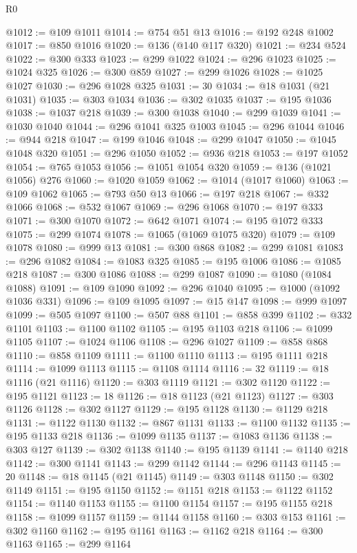 \begin{lexlean}{R0}
\begin{coremodule}
@1012 := @109 @1011
@1014 := @754 @51 @13
@1016 := @192 @248 @1002
@1017 := @850 @1016
@1020 := @136 (@140 @117 @320)
@1021 := @234 @524
@1022 := @300 @333
@1023 := @299 @1022
@1024 := @296 @1023
@1025 := @1024 @325
@1026 := @300 @859
@1027 := @299 @1026
@1028 := @1025 @1027
@1030 := @296 @1028 @325
@1031 := 30
@1034 := @18 @1031 (@21 @1031)
@1035 := @303 @1034
@1036 := @302 @1035
@1037 := @195 @1036
@1038 := @1037 @218
@1039 := @300 @1038
@1040 := @299 @1039
@1041 := @1030 @1040
@1044 := @296 @1041 @325 @1003
@1045 := @296 @1044
@1046 := @944 @218
@1047 := @199 @1046
@1048 := @299 @1047
@1050 := @1045 @1048 @320
@1051 := @296 @1050
@1052 := @936 @218
@1053 := @197 @1052
@1054 := @765 @1053
@1056 := @1051 @1054 @320
@1059 := @136 (@1021 @1056) @276
@1060 := @1020 @1059
@1062 := @1014 (@1017 @1060)
@1063 := @109 @1062
@1065 := @793 @50 @13
@1066 := @197 @218
@1067 := @332 @1066
@1068 := @532 @1067
@1069 := @296 @1068
@1070 := @197 @333
@1071 := @300 @1070
@1072 := @642 @1071
@1074 := @195 @1072 @333
@1075 := @299 @1074
@1078 := @1065 (@1069 @1075 @320)
@1079 := @109 @1078
@1080 := @999 @13
@1081 := @300 @868
@1082 := @299 @1081
@1083 := @296 @1082
@1084 := @1083 @325
@1085 := @195 @1006
@1086 := @1085 @218
@1087 := @300 @1086
@1088 := @299 @1087
@1090 := @1080 (@1084 @1088)
@1091 := @109 @1090
@1092 := @296 @1040
@1095 := @1000 (@1092 @1036 @331)
@1096 := @109 @1095
@1097 := @15 @147
@1098 := @999 @1097
@1099 := @505 @1097
@1100 := @507 @88
@1101 := @858 @399
@1102 := @332 @1101
@1103 := @1100 @1102
@1105 := @195 @1103 @218
@1106 := @1099 @1105
@1107 := @1024 @1106
@1108 := @296 @1027
@1109 := @858 @868
@1110 := @858 @1109
@1111 := @1100 @1110
@1113 := @195 @1111 @218
@1114 := @1099 @1113
@1115 := @1108 @1114
@1116 := 32
@1119 := @18 @1116 (@21 @1116)
@1120 := @303 @1119
@1121 := @302 @1120
@1122 := @195 @1121
@1123 := 18
@1126 := @18 @1123 (@21 @1123)
@1127 := @303 @1126
@1128 := @302 @1127
@1129 := @195 @1128
@1130 := @1129 @218
@1131 := @1122 @1130
@1132 := @867 @1131
@1133 := @1100 @1132
@1135 := @195 @1133 @218
@1136 := @1099 @1135
@1137 := @1083 @1136
@1138 := @303 @127
@1139 := @302 @1138
@1140 := @195 @1139
@1141 := @1140 @218
@1142 := @300 @1141
@1143 := @299 @1142
@1144 := @296 @1143
@1145 := 20
@1148 := @18 @1145 (@21 @1145)
@1149 := @303 @1148
@1150 := @302 @1149
@1151 := @195 @1150
@1152 := @1151 @218
@1153 := @1122 @1152
@1154 := @1140 @1153
@1155 := @1100 @1154
@1157 := @195 @1155 @218
@1158 := @1099 @1157
@1159 := @1144 @1158
@1160 := @303 @153
@1161 := @302 @1160
@1162 := @195 @1161
@1163 := @1162 @218
@1164 := @300 @1163
@1165 := @299 @1164

\end{coremodule}
\end{lexlean}
